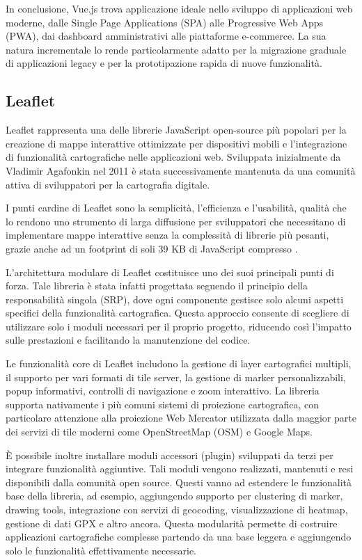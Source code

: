 In conclusione, Vue.js trova applicazione ideale nello sviluppo di applicazioni web moderne, dalle Single Page Applications (SPA) alle Progressive Web Apps (PWA), dai dashboard amministrativi alle piattaforme e-commerce. La sua natura incrementale lo rende particolarmente adatto per la migrazione graduale di applicazioni legacy e per la prototipazione rapida di nuove funzionalità.

\subsection{Leaflet}

Leaflet rappresenta una delle librerie JavaScript open-source più popolari per la creazione di mappe interattive ottimizzate per dispositivi mobili e l'integrazione di funzionalità cartografiche nelle applicazioni web. Sviluppata inizialmente da Vladimir Agafonkin nel 2011 \cite{agafonkin2011leaflet} è stata successivamente mantenuta da una comunità attiva di sviluppatori per la cartografia digitale.

I punti cardine di Leaflet sono la semplicità, l'efficienza e l'usabilità, qualità che lo rendono uno strumento di larga diffusione per sviluppatori che necessitano di implementare mappe interattive senza la complessità di librerie più pesanti, grazie anche ad un footprint di soli 39 KB di JavaScript compresso \cite{leafletnpm2024}.

L'architettura modulare di Leaflet costituisce uno dei suoi principali punti di forza. Tale libreria è stata infatti progettata seguendo il principio della responsabilità singola (SRP), dove ogni componente gestisce solo alcuni aspetti specifici della funzionalità cartografica. Questa approccio consente di scegliere di utilizzare solo i moduli necessari per il proprio progetto, riducendo così l'impatto sulle prestazioni e facilitando la manutenzione del codice.

Le funzionalità core di Leaflet includono la gestione di layer cartografici multipli, il supporto per vari formati di tile server, la gestione di marker personalizzabili, popup informativi, controlli di navigazione e zoom interattivo. La libreria supporta nativamente i più comuni sistemi di proiezione cartografica, con particolare attenzione alla proiezione Web Mercator utilizzata dalla maggior parte dei servizi di tile moderni come OpenStreetMap (OSM) e Google Maps.

È possibile inoltre installare moduli accessori (plugin) sviluppati da terzi per integrare funzionalità aggiuntive. Tali moduli vengono realizzati, mantenuti e resi disponibili dalla comunità open source. Questi vanno ad estendere le funzionalità base della libreria, ad esempio, aggiungendo supporto per clustering di marker, drawing tools, integrazione con servizi di geocoding, visualizzazione di heatmap, gestione di dati GPX e altro ancora. Questa modularità permette di costruire applicazioni cartografiche complesse partendo da una base leggera e aggiungendo solo le funzionalità effettivamente necessarie.

